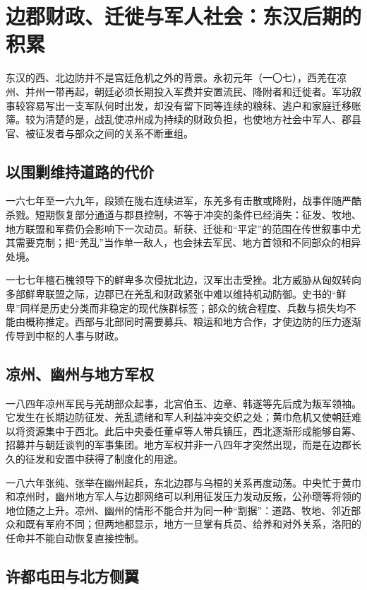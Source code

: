 \section{边郡财政、迁徙与军人社会：东汉后期的积累}
\label{sec:eastern-han-border-finance-society}

东汉的西、北边防并不是宫廷危机之外的背景。永初元年（一〇七），西羌在凉州、并州一带再起，朝廷必须长期投入军费并安置流民、降附者和迁徙者。军功叙事较容易写出一支军队何时出发，却没有留下同等连续的粮秣、逃户和家庭迁移账簿。较为清楚的是，战乱使凉州成为持续的财政负担，也使地方社会中军人、郡县官、被征发者与部众之间的关系不断重组。

\subsection{以围剿维持道路的代价}

一六七年至一六九年，段颎在陇右连续进军，东羌多有击散或降附，战事伴随严酷杀戮。短期恢复部分通道与郡县控制，不等于冲突的条件已经消失：征发、牧地、地方联盟和军费仍会影响下一次动员。斩获、迁徙和“平定”的范围在传世叙事中尤其需要克制；把“羌乱”当作单一敌人，也会抹去军民、地方首领和不同部众的相异处境。

一七七年檀石槐领导下的鲜卑多次侵扰北边，汉军出击受挫。北方威胁从匈奴转向多部鲜卑联盟之际，边郡已在羌乱和财政紧张中难以维持机动防御。史书的“鲜卑”同样是历史分类而非稳定的现代族群标签；部众的统合程度、兵数与损失均不能由概称推定。西部与北部同时需要募兵、粮运和地方合作，才使边防的压力逐渐传导到中枢的人事与财政。

\subsection{凉州、幽州与地方军权}

一八四年凉州军民与羌胡部众起事，北宫伯玉、边章、韩遂等先后成为叛军领袖。它发生在长期边防征发、羌乱遗绪和军人利益冲突交织之处；黄巾危机又使朝廷难以将资源集中于西北。此后中央委任董卓等人带兵镇压，西北逐渐形成能够自筹、招募并与朝廷谈判的军事集团。地方军权并非一八四年才突然出现，而是在边郡长久的征发和安置中获得了制度化的用途。

一八六年张纯、张举在幽州起兵，东北边郡与乌桓的关系再度动荡。中央忙于黄巾和凉州时，幽州地方军人与边郡网络可以利用征发压力发动反叛，公孙瓒等将领的地位随之上升。凉州、幽州的情形不能合并为同一种“割据”：道路、牧地、邻近部众和既有军府不同；但两地都显示，地方一旦掌有兵员、给养和对外关系，洛阳的任命并不能自动恢复直接控制。

\subsection{许都屯田与北方侧翼}

